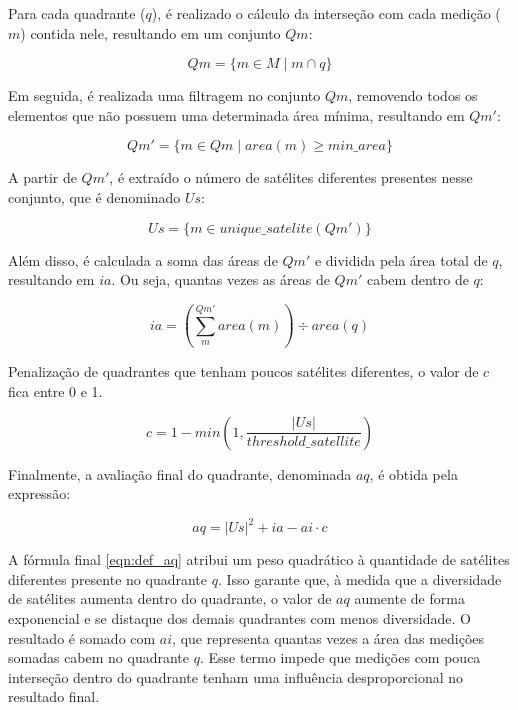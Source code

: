 \documentclass[cic,tc]{iiufrgs}
\begin{document}
Para cada quadrante ($q$), é realizado o cálculo da interseção com cada medição ($m$) contida nele, resultando em um conjunto $Qm$:

\begin{equation} \label{eqn:def_qm}
Qm = \{ m \in M \mid m \cap q \}
\end{equation}

Em seguida, é realizada uma filtragem no conjunto $Qm$, removendo todos os elementos que não possuem uma determinada área mínima, resultando em $Qm'$:

\begin{equation} \label{eqn:def_qm_line}
Qm' = \{ m \in Qm \mid area\left(m\right) \ge min\_area \}
\end{equation}

A partir de $Qm'$, é extraído o número de satélites diferentes presentes nesse conjunto, que é denominado $Us$:

\begin{equation} \label{eqn:def_us}
Us = \{ m \in unique\_satelite\left(Qm'\right) \}
\end{equation}

Além disso, é calculada a soma das áreas de $Qm'$ e dividida pela área total de $q$, resultando em $ia$. Ou seja, quantas vezes as áreas de $Qm'$ cabem dentro de $q$:

\begin{equation} \label{eqn:def_ia}
ia = \left(\sum_{m}^{Qm'} area\left(m\right)\right) \div area(q)
\end{equation}

Penalização de quadrantes que tenham poucos satélites diferentes, o valor de $c$ fica entre 0 e 1.

\begin{equation} \label{eqn:def_c}
c = 1 - min\left(1, \frac{|Us|}{threshold\_satellite}\right)
\end{equation}

Finalmente, a avaliação final do quadrante, denominada $aq$, é obtida pela expressão:

\begin{equation} \label{eqn:def_aq}
aq = |Us|^2 + ia - ai \cdot c
\end{equation}

A fórmula final \ref{eqn:def_aq} atribui um peso quadrático à quantidade de satélites diferentes presente no quadrante $q$. Isso garante que, à medida que a diversidade de satélites aumenta dentro do quadrante, o valor de $aq$ aumente de forma exponencial e se distaque dos demais quadrantes com menos diversidade. O resultado é somado com $ai$, que representa quantas vezes a área das medições somadas cabem no quadrante $q$. Esse termo impede que medições com pouca interseção dentro do quadrante tenham uma influência desproporcional no resultado final.
\end{document}
